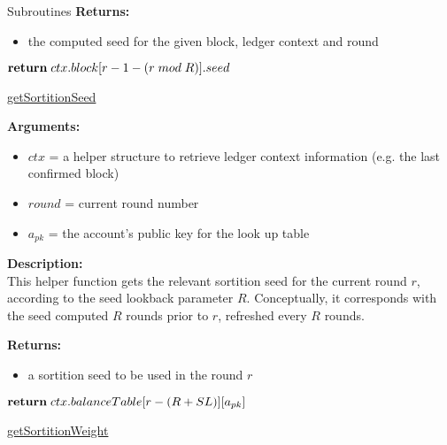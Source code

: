 \documentclass[10pt,a4paper]{article}
\begin{document}
\begin{section}{Subroutines}
\noindent \textbf{Returns:}
\begin{itemize}
    \item the computed seed for the given block, ledger context and round
  \end{itemize}


\begin{algorithm}[H]
    \begin{algorithmic}[H]
        
            $\Return\;ctx.block[r-1-(r\;mod\;R)].seed$

        \EndFunction
    \end{algorithmic}
    \caption{\underline{getSortitionSeed}}
\end{algorithm}

\noindent \textbf{Arguments:}
\begin{itemize}
    \item $ctx$ = a helper structure to retrieve ledger context information (e.g. the last confirmed block)
    \item $round$ = current round number
    \item $a_{pk}$ = the account's public key for the look up table
  \end{itemize}


\noindent \textbf{Description:}\\
This helper function gets the relevant sortition seed for the current round $r$, according to the seed lookback parameter $R$.
Conceptually, it corresponds with the seed computed $R$ rounds prior to $r$, refreshed every $R$ rounds.

\noindent \textbf{Returns:}
\begin{itemize}
    \item a sortition seed to be used in the round $r$
  \end{itemize}


\begin{algorithm}[H]
    \begin{algorithmic}[H]

            $\Return\;ctx.balanceTable[r - (R + SL)][a_{pk}]$

        \EndFunction
    \end{algorithmic}
    \caption{\underline{getSortitionWeight}}
\end{algorithm}


\end{section}
\end{document}
